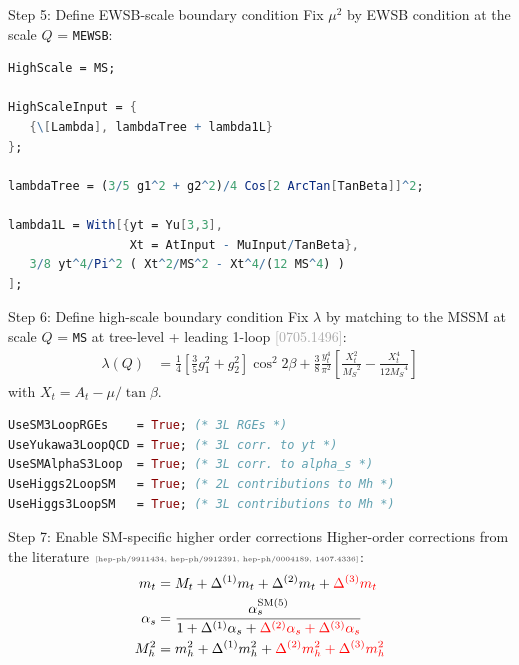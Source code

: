 \documentclass[hyperref={pdfpagelabels=false},ngerman]{beamer}
\newcommand{\MS}{\ensuremath{M_S}}
\newcommand{\mycite}[1]{\ensuremath{\text{\textcolor{darkgray}{\tiny [#1]}}}}
\newcommand{\bigcite}[1]{\textcolor{darkgray}{[#1]}}
\newcommand{\SM}{\ensuremath{\text{SM}}}
\newcommand{\as}{\alpha_s}
\begin{document}
\begin{frame}{Step 5: Define EWSB-scale boundary condition}
  Fix $\mu^2$ by EWSB condition at the scale $Q$ = \lstinline{MEWSB}:\\[2em]
  \usebox{\listbox}
\end{frame}

\begin{lrbox}{\listbox}\begin{lstlisting}[language=Mathematica]
HighScale = MS;

HighScaleInput = {
   {\[Lambda], lambdaTree + lambda1L}
};

lambdaTree = (3/5 g1^2 + g2^2)/4 Cos[2 ArcTan[TanBeta]]^2;

lambda1L = With[{yt = Yu[3,3],
                 Xt = AtInput - MuInput/TanBeta},
   3/8 yt^4/Pi^2 ( Xt^2/MS^2 - Xt^4/(12 MS^4) )
];
\end{lstlisting}\end{lrbox}

\begin{frame}{Step 6: Define high-scale boundary condition}
  Fix $\lambda$ by matching to the MSSM at scale
  $Q$ = \texttt{MS} at tree-level + leading 1-loop
  \bigcite{0705.1496}:
  \begin{align*}
    \lambda(Q) &= \frac{1}{4} \left[ \frac{3}{5} g_1^2 + g_2^2 \right] \cos^2 2\beta
    + \frac{3}{8} \frac{y_t^4}{\pi^2}\left[
       \frac{X_t^2}{\MS^2}
       - \frac{X_t^4}{12 \MS^4}
    \right]
  \end{align*}
  with $X_t = A_t - \mu/\tan\beta$.
  \\[1em]
  \usebox{\listbox}
\end{frame}

\begin{lrbox}{\listbox}\begin{lstlisting}[language=Mathematica]
UseSM3LoopRGEs    = True; (* 3L RGEs *)
UseYukawa3LoopQCD = True; (* 3L corr. to yt *)
UseSMAlphaS3Loop  = True; (* 3L corr. to alpha_s *)
UseHiggs2LoopSM   = True; (* 2L contributions to Mh *)
UseHiggs3LoopSM   = True; (* 3L contributions to Mh *)
\end{lstlisting}\end{lrbox}

\begin{frame}{Step 7: Enable SM-specific higher order corrections}
  Higher-order corrections from the literature \mycite{hep-ph/9911434,
    hep-ph/9912391, hep-ph/0004189, 1407.4336}:
  \begin{align*}
    m_t &= M_t + \Delta^{(1)} m_t + \Delta^{(2)} m_t + \textcolor{red}{\Delta^{(3)} m_t} \\
    \alpha_s &= \frac{\alpha_s^{\SM(5)}}{1 + \Delta^{(1)} \as + \textcolor{red}{\Delta^{(2)} \as + \Delta^{(3)} \as}} \\
    M_h^2 &= m_h^2 + \Delta^{(1)} m_h^2 + \textcolor{red}{\Delta^{(2)} m_h^2 + \Delta^{(3)} m_h^2}
  \end{align*}
  \\[1em]
  \usebox{\listbox}
\end{frame}
\end{document}
